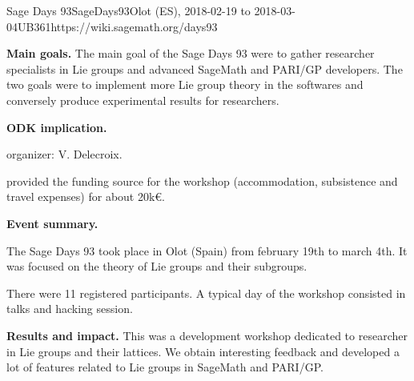 \begin{event}{Sage Days 93}{SageDays93}{Olot (ES),
2018-02-19 to 2018-03-04}{UB}{36}{1}{https://wiki.sagemath.org/days93}

\textbf{Main goals.}
The main goal of the Sage Days 93 were to
gather researcher specialists in Lie groups and advanced
SageMath and PARI/GP developers. The two goals were to implement
more Lie group theory in the softwares and conversely produce
experimental results for researchers.


\textbf{ODK implication.} 

\ODK organizer: V. Delecroix.

\ODK provided the funding source for the workshop (accommodation,
subsistence and travel expenses) for about 20k\euro.

\textbf{Event summary.} 

The Sage Days 93 took place in Olot (Spain) from february 19th to
march 4th. It was focused on the theory of Lie groups and their
subgroups.

There were 11 registered participants. A typical day of the workshop
consisted in talks and hacking session.

\textbf{Results and impact.} 
This was a development workshop dedicated to researcher in Lie groups
and their lattices. We obtain interesting feedback and developed
a lot of features related to Lie groups in SageMath and PARI/GP.
\end{event}
